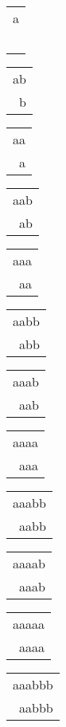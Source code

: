 \begin{tabular}{|l|} \hline
a \\
\  \\
\hline
\end{tabular} 
\begin{tabular}{|l|} \hline
ab \\
\ b \\
\hline
\end{tabular} 
\begin{tabular}{|l|} \hline
aa \\
\ a \\
\hline
\end{tabular} 
\begin{tabular}{|l|} \hline
aab \\
\ ab \\
\hline
\end{tabular} 
\begin{tabular}{|l|} \hline
aaa \\
\ aa \\
\hline
\end{tabular} 
\begin{tabular}{|l|} \hline
aabb \\
\ abb \\
\hline
\end{tabular} 
\begin{tabular}{|l|} \hline
aaab \\
\ aab \\
\hline
\end{tabular} 
\begin{tabular}{|l|} \hline
aaaa \\
\ aaa \\
\hline
\end{tabular} 
\begin{tabular}{|l|} \hline
aaabb \\
\ aabb \\
\hline
\end{tabular} 
\begin{tabular}{|l|} \hline
aaaab \\
\ aaab \\
\hline
\end{tabular} 
\begin{tabular}{|l|} \hline
aaaaa \\
\ aaaa \\
\hline
\end{tabular} 
\begin{tabular}{|l|} \hline
aaabbb \\
\ aabbb \\
\hline
\end{tabular} 
